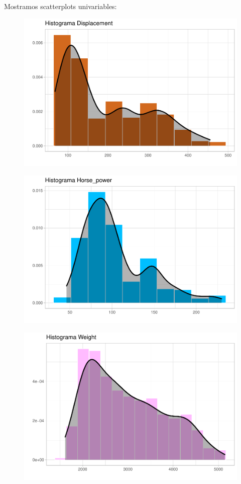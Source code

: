 Mostramos scatterplots univariables:
\begin{figure}[H]\includegraphics[width=.9\linewidth]{img/EDA_files/figure-latex/unnamed-chunk-7-1}\caption{}\end{figure}
\begin{figure}[H]\includegraphics[width=.9\linewidth]{img/EDA_files/figure-latex/unnamed-chunk-7-2} \caption{}\end{figure}
\begin{figure}[H]\includegraphics[width=.9\linewidth]{img/EDA_files/figure-latex/unnamed-chunk-7-3} \caption{}\end{figure}
